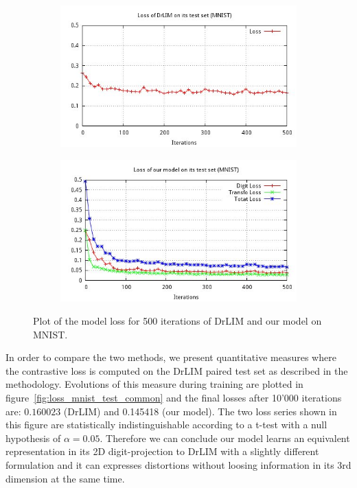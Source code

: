\documentclass[a4paper,12pt]{report}
\begin{document}
\begin{figure}[h]
    \centering
    \begin{subfigure}{0.45\textwidth}
        \centering
        \includegraphics[width=\textwidth]{thesis_figures/final_loss_testset_2bv7.jpg}
    \end{subfigure}
    \begin{subfigure}{0.45\textwidth}
        \centering
        \includegraphics[width=\textwidth]{thesis_figures/final_loss_testset_3Dc3.jpg}
    \end{subfigure}
    \caption{Plot of the model loss for 500 iterations of DrLIM and our model on MNIST.}
    \label{fig:mnist_cl2d_loss}
\end{figure}

In order to compare the two methods, we present quantitative measures where the contrastive loss is computed on the DrLIM paired test set as described in the methodology.
Evolutions of this measure during training are plotted in figure~\ref{fig:loss_mnist_test_common} and the final losses after 10'000 iterations are: $0.160023$ (DrLIM) and 0.145418 (our model).
The two loss series shown in this figure are statistically indistinguishable according to a t-test with a null hypothesis of $\alpha = 0.05$.
Therefore we can conclude our model learns an equivalent representation in its 2D digit-projection to DrLIM with a slightly different formulation and it can expresses distortions without loosing information in its 3rd dimension at the same time.
\end{document}
